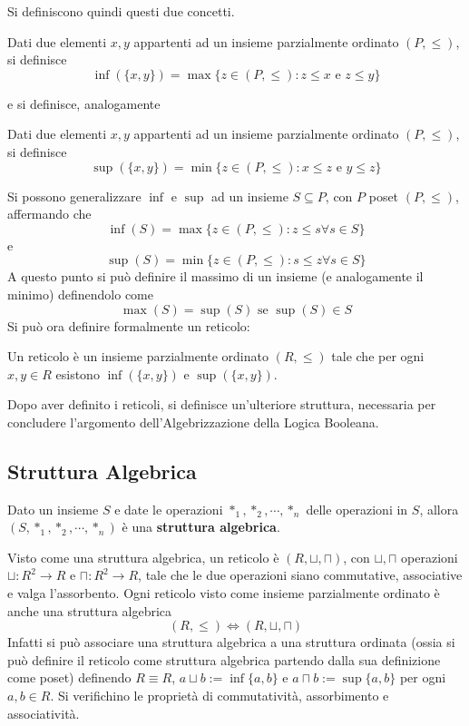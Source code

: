 Si definiscono quindi questi due concetti. 

\begin{defi}
        Dati due elementi $x, y$ appartenti ad un insieme 
        parzialmente ordinato $(P, \leq)$, si definisce 
        $$
        \inf(\{x,y\}) = \max\{z \in (P, \leq): z \leq x \text{ e } z \leq y\}
        $$
\end{defi}
e si definisce, analogamente 
\begin{defi}
        Dati due elementi $x, y$ appartenti ad un insieme 
        parzialmente ordinato $(P, \leq)$, si definisce 
        $$
        \sup(\{x,y\}) = \min\{z \in (P, \leq): x \leq z \text{ e } y \leq z\}
        $$
\end{defi}
Si possono generalizzare $\inf$ e $\sup$ ad un insieme $S \subseteq P$, con 
$P$ poset $(P, \leq)$, affermando che 
$$
        \inf(S) = \max\{z \in (P, \leq): z \leq s \forall s \in S\}
$$
e 
$$
        \sup(S) = \min\{z \in (P, \leq): s \leq z \forall s \in S\}
$$
A questo punto si può definire il massimo di un insieme (e analogamente il minimo) 
definendolo come 
$$
        \max(S) = \sup(S) \text{ se } \sup(S) \in S
$$
Si può ora definire formalmente un reticolo: 
\begin{defi}[Reticolo]
Un reticolo è un insieme parzialmente ordinato $(R, \leq)$ tale che 
per ogni $x, y \in R$ esistono $\inf(\{x,y\})$ e $\sup(\{x,y\})$. 
\end{defi}

\noindent 
Dopo aver definito i reticoli, si definisce un'ulteriore struttura, necessaria 
per concludere l'argomento dell'Algebrizzazione della Logica Booleana. 

\subsection{Struttura Algebrica}

Dato un insieme $S$ e
date le operazioni $*_1, *_2, \cdots, *_n$ delle operazioni 
in $S$, allora $(S, *_1, *_2, \cdots, *_n)$ è una \textbf{struttura algebrica}. 

Visto come una struttura algebrica, un reticolo 
è $(R, \sqcup, \sqcap)$, con $\sqcup, \sqcap$ operazioni 
$\sqcup: R^2 \rightarrow R$ e $ \sqcap: R^2 \rightarrow R$, tale che 
le due operazioni siano commutative, associative e 
valga l'assorbento. 
Ogni reticolo visto come insieme parzialmente 
ordinato è anche una struttura algebrica 
$$
(R, \leq) \iff (R, \sqcup, \sqcap)
$$
Infatti si può associare una struttura algebrica 
a una struttura ordinata 
(ossia si può definire il reticolo come 
struttura algebrica partendo dalla sua definizione come 
poset) definendo $R\equiv R$, 
$a \sqcup b := \inf \{a,b\}$ e $a \sqcap b := \sup \{a,b\}$ 
per ogni $a,b \in R$. Si verifichino 
le proprietà di 
commutatività, assorbimento e associatività. 

